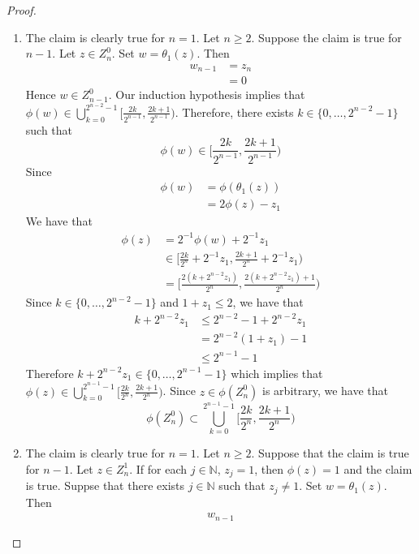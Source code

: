 \documentclass{book}
\theoremstyle{definition}
\newcommand{\N}{\mathbb{N}}
\DeclareMathOperator*{\0}{\mbf{0}}
\DeclareMathOperator*{\1}{\mbf{1}}
\begin{document}
	\begin{proof}\
		\begin{enumerate}
			\item The claim is clearly true for $n = 1$. Let $n \geq 2$. Suppose the claim is true for $n-1$. Let $z \in Z_n^0$. Set $w = \theta_1 (z)$. 
			Then 
			\begin{align*}
				w_{n-1} 
				& = z_n \\
				& = 0
			\end{align*}
			Hence $w \in Z_{n-1}^0$. Our induction hypothesis implies that $\phi(w) \in \bigcup\limits_{k =0}^{2^{n-2} -1} \bigg[ \frac{2k}{2^{n-1}}, \frac{2k+1}{2^{n-1}} \bigg)$.
			Therefore, there exists $k \in \{0, \ldots, 2^{n-2} -1\}$ such that $$\phi(w) \in \bigg[ \frac{2k}{2^{n-1}}, \frac{2k+1}{2^{n-1}} \bigg)$$ Since 
			\begin{align*}
				\phi(w) 
				& = \phi(\theta_1(z)) \\
				& = 2 \phi(z) - z_1
			\end{align*}
			We have that
			\begin{align*}
				\phi(z) 
				& = 2^{-1}\phi(w) + 2^{-1} z_1 \\
				& \in \bigg[ \frac{2k}{2^n} + 2^{-1}z_1, \frac{2k + 1}{2^n} +  2^{-1}z_1 \bigg) \\
				& = \bigg[ \frac{2(k+ 2^{n-2}z_1)}{2^n}, \frac{2(k+ 2^{n-2}z_1) + 1}{2^n} \bigg) 
			\end{align*}
			Since $k \in \{0, \ldots, 2^{n-2} -1\}$ and $1 + z_1 \leq 2$, we have that 
			\begin{align*}
				k+ 2^{n-2}z_1 
				& \leq 2^{n-2} -1 + 2^{n-2}z_1  \\
				&  =  2^{n-2}(1 + z_1) - 1 \\
				& \leq 2^{n-1} - 1
			\end{align*} 
			Therefore $	k+ 2^{n-2}z_1 \in \{0, \ldots, 2^{n-1} - 1\}$ which implies that $\phi(z) \in  \bigcup\limits_{k =0}^{2^{n-1} -1} \bigg[ \frac{2k}{2^n}, \frac{2k+1}{2^n} \bigg)$. Since $z \in \phi(Z_n^0)$ is arbitrary, we have that
			$$\phi(Z_n^0) \subset \bigcup\limits_{k =0}^{2^{n-1} - 1} \bigg[ \frac{2k}{2^n}, \frac{2k+1}{2^n} \bigg)$$
			\item The claim is clearly true for $n =1$. Let $n \geq 2$. Suppose that the claim is true for $n-1$. Let $z \in Z_n^1$. If for each $j \in \N$, $z_j = 1$, then $\phi(z) = 1$ and the claim is true. Suppse that there exists $j \in \N$ such that $z_j \neq 1$. Set $w = \theta_1(z)$. Then 
			\begin{align*}
				w_{n-1} 

\end{align*}
\end{enumerate}
\end{proof}
\end{document}
